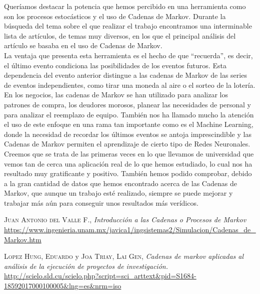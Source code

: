 \documentclass[10pt,a4paper]{article}
\begin{document}
Queríamos destacar la potencia que hemos percibido en una herramienta como son los procesos estocásticos y el uso de Cadenas de Markov. Durante la búsqueda del tema sobre el que realizar el trabajo encontramos una interminable lista de artículos, de temas muy diversos, en los que el principal análisis del artículo se basaba en el uso de Cadenas de Markov. \\

La ventaja que presenta esta herramienta es el hecho de que ``recuerda'', es decir, el último evento condiciona las posibilidades de los eventos futuros. Esta dependencia del evento anterior distingue a las cadenas de Markov de las series de eventos independientes, como tirar una moneda al aire o el sorteo de la lotería. En los negocios, las cadenas de Markov se han utilizado para analizar los patrones de compra, los deudores morosos, planear las necesidades de personal y para analizar el reemplazo de equipo. También nos ha llamado mucho la atención el uso de este enfoque en una rama tan importante como es el Machine Learning, donde la necesidad de recordar los últimos eventos se antoja imprescindible y las Cadenas de Markov permiten el aprendizaje de cierto tipo de Redes Neuronales. \\

Creemos que se trata de las primeras veces en lo que llevamos de universidad que vemos tan de cerca una aplicación real de lo que hemos estudiado, lo cual nos ha resultado muy gratificante y positivo. También hemos podido comprobar, debido a la gran cantidad de datos que hemos encontrado acerca de las Cadenas de Markov, que aunque un trabajo esté realizado, siempre se puede mejorar y trabajar más aún para conseguir unos resultados más verídicos.

\newpage

\begin{thebibliography}{X}
 \textsc{Juan Antonio del Valle F.},
	\textit{Introducción a las Cadenas o Procesos de Markov} \url{https://www.ingenieria.unam.mx/javica1/ingsistemas2/Simulacion/Cadenas_de_Markov.htm}
	
 \textsc{Lopez Hung, Eduardo} y \textsc{Joa Triay, Lai Gen}, \textit{Cadenas de markov aplicadas al análisis de la ejecución de proyectos de investigación.} \url{http://scielo.sld.cu/scielo.php?script=sci_arttext&pid=S1684-18592017000100005&lng=es&nrm=iso}
\end{thebibliography}
\end{document}
